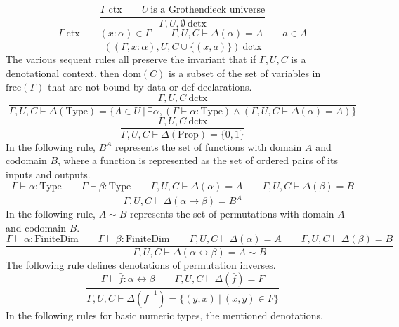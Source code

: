 \documentclass[11pt]{article}
\begin{document}
\begin{equation}
	\frac{\Gamma\ \text{ctx}
	\qquad U\ \text{is a Grothendieck universe}}
	{\Gamma,U,\emptyset\ \text{dctx}}
\end{equation}
\begin{equation}
	\frac{\Gamma\ \text{ctx}
	\qquad (x : \alpha) \in \Gamma
	\qquad \Gamma,U,C \vdash \Delta(\alpha) = A
	\qquad a \in A}
	{((\Gamma, x : \alpha), U, C \cup \{(x,a)\})\ \text{dctx}}
\end{equation}
The various sequent rules all preserve the invariant
that if $\Gamma,U,C$ is a denotational context,
then $\text{dom}(C)$ is a subset of the set of variables
in $\text{free}(\Gamma)$ that are not bound by data or
def declarations.
\begin{equation}
	\frac{\Gamma,U,C\ \text{dctx}}
	{\Gamma,U,C \vdash \Delta(\text{Type}) =
	\{A \in U\ |\ \exists \alpha,
	(\Gamma \vdash \alpha : \text{Type})
	\wedge (\Gamma,U,C \vdash \Delta(\alpha) = A)\}}
\end{equation}
\begin{equation}
	\frac{\Gamma,U,C\ \text{dctx}}
	{\Gamma,U,C \vdash \Delta(\text{Prop}) = \{0,1\}}
\end{equation}
In the following rule, $B^A$ represents the set of functions
with domain $A$ and codomain $B$, where a function is represented
as the set of ordered pairs of its inputs and outputs.
\begin{equation}
	\frac{\Gamma \vdash \alpha : \text{Type}
	\qquad \Gamma \vdash \beta : \text{Type}
	\qquad \Gamma,U,C \vdash \Delta(\alpha) = A
	\qquad \Gamma,U,C \vdash \Delta(\beta) = B}
	{\Gamma,U,C \vdash \Delta(\alpha \to \beta) = B^A}
\end{equation}
In the following rule, $A \sim B$ represents the set of permutations
with domain $A$ and codomain $B$.
\begin{equation}
	\frac{\Gamma \vdash \alpha : \text{FiniteDim}
	\qquad \Gamma \vdash \beta : \text{FiniteDim}
	\qquad \Gamma,U,C \vdash \Delta(\alpha) = A
	\qquad \Gamma,U,C \vdash \Delta(\beta) = B}
	{\Gamma,U,C \vdash \Delta(\alpha \leftrightarrow \beta) = A \sim B}
\end{equation}
The following rule defines denotations of permutation inverses.
\begin{equation}
	\frac{\Gamma \vdash \bar{f} : \alpha \leftrightarrow \beta
	\qquad \Gamma,U,C \vdash \Delta(\bar{f}) = F}
	{\Gamma,U,C \vdash \Delta(\bar{f}^{-1}) = \{(y,x)\ |\ (x,y) \in F\}}
\end{equation}
In the following rules for basic numeric types, the mentioned denotations,
\end{document}
